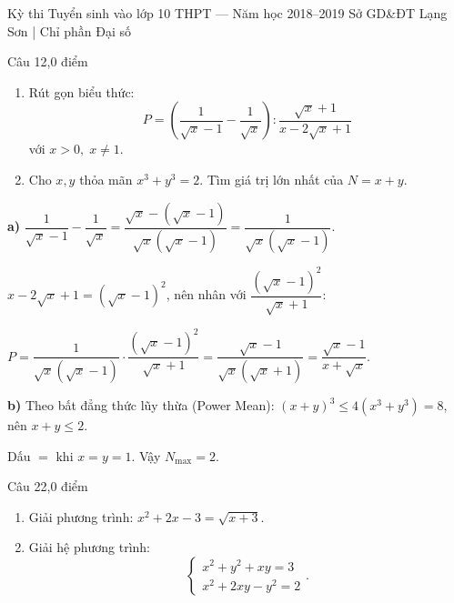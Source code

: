 ﻿%
%
  {Kỳ thi Tuyển sinh vào lớp 10 THPT — Năm học 2018--2019}%
  {Sở GD\&ĐT Lạng Sơn | Chỉ phần Đại số}

\begin{de_cau}{Câu 1}{2,0 điểm}
\begin{enumerate}[label=\alph*)]
  \item Rút gọn biểu thức:
  \[P = \left(\dfrac{1}{\sqrt{x}-1} - \dfrac{1}{\sqrt{x}}\right) : \dfrac{\sqrt{x}+1}{x-2\sqrt{x}+1}\]
  với $x > 0,\; x \neq 1$.
  \item Cho $x, y$ thỏa mãn $x^3 + y^3 = 2$. Tìm giá trị lớn nhất của $N = x + y$.
\end{enumerate}
\end{de_cau}

\begin{loi_giai_cau}
\textbf{a)} $\dfrac{1}{\sqrt{x}-1}-\dfrac{1}{\sqrt{x}}=\dfrac{\sqrt{x}-(\sqrt{x}-1)}{\sqrt{x}(\sqrt{x}-1)}=\dfrac{1}{\sqrt{x}(\sqrt{x}-1)}$.

$x-2\sqrt{x}+1=(\sqrt{x}-1)^2$, nên nhân với $\dfrac{(\sqrt{x}-1)^2}{\sqrt{x}+1}$:

$P=\dfrac{1}{\sqrt{x}(\sqrt{x}-1)}\cdot\dfrac{(\sqrt{x}-1)^2}{\sqrt{x}+1}=\dfrac{\sqrt{x}-1}{\sqrt{x}(\sqrt{x}+1)}=\boxed{\dfrac{\sqrt{x}-1}{x+\sqrt{x}}}$.

\textbf{b)} Theo bất đẳng thức lũy thừa (Power Mean): $(x+y)^3 \le 4(x^3+y^3)=8$, nên $x+y\le2$.

Dấu $=$ khi $x=y=1$. Vậy $N_{\max}=\boxed{2}$.
\end{loi_giai_cau}

\begin{de_cau}{Câu 2}{2,0 điểm}
\begin{enumerate}[label=\alph*)]
  \item Giải phương trình: $x^2 + 2x - 3 = \sqrt{x+3}$.
  \item Giải hệ phương trình:
  \[\begin{cases} x^2 + y^2 + xy = 3 \\ x^2 + 2xy - y^2 = 2 \end{cases}.\]
\end{enumerate}
\end{de_cau}


